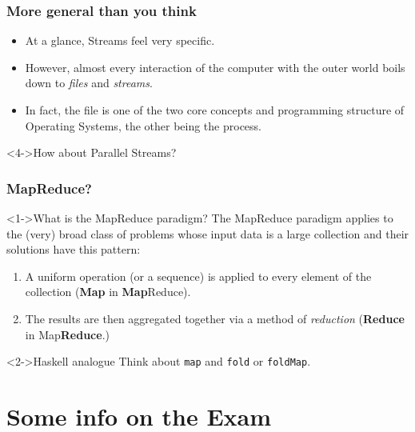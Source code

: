 \documentclass[xcolor={dvipsnames,svgnames},aspectratio=169]{beamer}
\begin{document}
\begin{frame}[fragile]
  \frametitle{More general than you think}
  \begin{itemize}
  \item[\faBook]<1-> At a glance, Streams feel very specific.
  \item[\faBook]<2-> However, almost every interaction of the computer with the
    outer world boils down to \emph{files} and \emph{streams}.
  \item[\faBook]<3-> In fact, the file is one of the two core
    concepts and programming structure of Operating Systems, the other being the process.
  \end{itemize}

  \vspace{0.6cm}

  \begin{block}<4->{\faLightbulb \quad How about Parallel Streams?}
  \end{block}
\end{frame}

\begin{frame}[fragile]
  \frametitle{MapReduce?}

  \begin{block}<1->{\faLightbulb \quad What is the MapReduce paradigm?}
    The MapReduce paradigm applies to the (very) broad class of problems whose
    input data is a large collection and their solutions have this pattern:
    \begin{enumerate}
    \item A uniform operation (or a sequence) is applied to every element
      of the collection (\textbf{Map} in \textbf{Map}Reduce).
    \item The results are then aggregated together via a method of
      \emph{reduction} (\textbf{Reduce} in Map\textbf{Reduce}.)
    \end{enumerate}
  \end{block}

  \begin{block}<2->{\faLightbulb \quad Haskell analogue}
    Think about \texttt{map} and \texttt{fold} or \texttt{foldMap}.
  \end{block}
\end{frame}

\section{Some info on the Exam}
\end{document}
